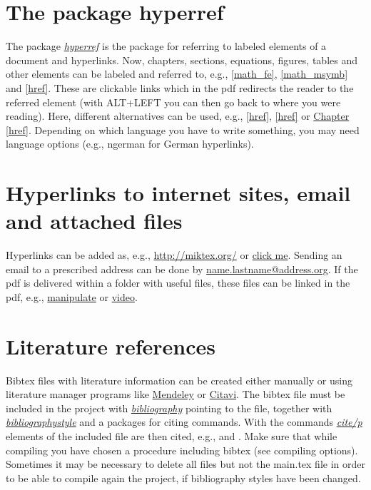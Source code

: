 \documentclass[a4paper,11pt,oneside]{book}
\newcommand{\imp}[1]{\underline{\textit{#1}}}
\begin{document}
\section{The package hyperref}

The package \imp{hyperref} is the package for referring to labeled elements of a document and hyperlinks. Now, chapters, sections, equations, figures, tables and other elements can be labeled and referred to, e.g., \autoref{math_fe}, \autoref{math_msymb} and \autoref{href}. These are clickable links which in the pdf redirects the reader to the referred element (with ALT+LEFT you can then go back to where you were reading). Here, different alternatives can be used, e.g., \ref{href}, \autoref{href} or \hyperref[href]{Chapter \ref*{href}}. Depending on which language you have to write something, you may need language options (e.g., ngerman for German hyperlinks).


\section{Hyperlinks to internet sites, email and attached files}

Hyperlinks can be added as, e.g., \url{http://miktex.org/} or \href{http://miktex.org/}{click me}. Sending an email to a prescribed address can be done by \href{mailto:name.lastname@address.org}{name.lastname@address.org}. If the pdf is delivered within a folder with useful files, these files can be linked in the pdf, e.g., \href{run:attachments/manipulate.nb}{manipulate} or \href{run:attachments/video.mp4}{video}.


\section{Literature references}

Bibtex files with literature information can be created either manually or using literature manager programs like \href{http://www.mendeley.com/}{Mendeley} or \href{http://citavi.com/en/index.html}{Citavi}. The bibtex file must be included in the project with \imp{bibliography} pointing to the file, together with \imp{bibliographystyle} and a packages for citing commands. With the commands \imp{cite/p} elements of the included file are then cited, e.g., \cite{Hill1952} and \citep{Kroner1977}. Make sure that while compiling you have chosen a procedure including bibtex (see compiling options). Sometimes it may be necessary to delete all files but not the main.tex file in order to be able to compile again the project, if bibliography styles have been changed.
\end{document}
